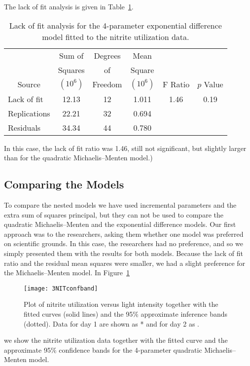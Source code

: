 The lack of fit analysis is given in Table~\ref{tbl:3.11}.
\begin{table}
  \caption{
  Lack of fit analysis for the 4-parameter exponential difference
  model fitted to the nitrite utilization data.}\label{tbl:3.11}
  \begin{center}
    \begin{tabular}{lccccc}\hline
      & \multicolumn{1}{c}{Sum of} & \multicolumn{1}{c}{Degrees} &
      \multicolumn{1}{c}{Mean}\\
      & \multicolumn{1}{c}{Squares} & \multicolumn{1}{c}{of} &
      \multicolumn{1}{c}{Square}\\
      \multicolumn{1}{c}{Source} & \multicolumn{1}{c}{$( 10^6 )$} &
      \multicolumn{1}{c}{Freedom} & \multicolumn{1}{c}{$( 10^6 )$} &
      \multicolumn{1}{c}{F Ratio} & \multicolumn{1}{c}{$p$ Value}\\ \hline
      Lack of fit&12.13&12&1.011&1.46&0.19\\
      Replications&22.21&32&0.694\\ \hline
      Residuals&34.34&44&0.780\\ \hline
    \end{tabular}
  \end{center}
\end{table}
In this case, the lack of fit ratio was 1.46, still not
significant, but slightly larger than for the quadratic
Michaelis--Menten model.)

\subsection{Comparing the Models}

To compare the nested models we have used incremental parameters
and the extra sum of squares principal, but they can not be used
to compare the quadratic Michaelis--Menten and the exponential
difference models.
Our first approach was to the researchers, asking them whether
one model was preferred on scientific grounds.
In this case, the researchers had no
preference, and so we simply presented them
with the results for both models.
Because the lack of fit ratio and the residual mean squares were
smaller, we had a slight preference for the Michaelis--Menten
model.
In Figure~\ref{fig:NITconfband}
\begin{figure}
  \centerline{\texttt{[image: 3NITconfband]}}%
  \caption{Plot of nitrite utilization versus light intensity together
    with the fitted curves (solid lines) and the 95\% approximate
    inference bands (dotted).  Data for day 1 are shown as * and for
    day 2 as .}
  \label{fig:NITconfband}
\end{figure}
we show the nitrite utilization data together with
the fitted curve and the approximate 95\% confidence bands for the
4-parameter quadratic Michaelis--Menten model.


